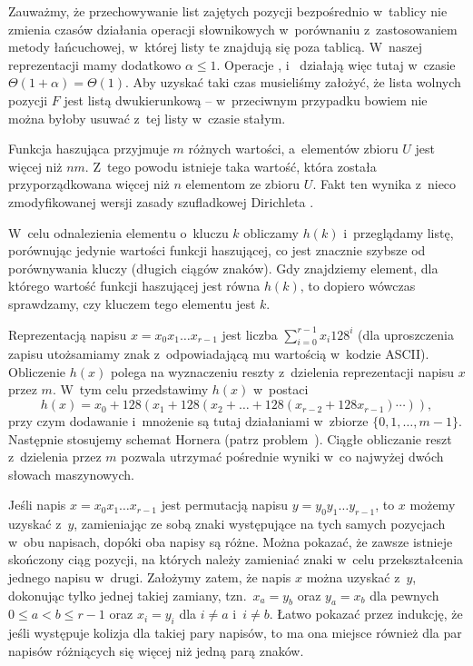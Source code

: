 Zauważmy, że przechowywanie list zajętych pozycji bezpośrednio w~tablicy nie zmienia czasów działania operacji słownikowych w~porównaniu z~zastosowaniem metody łańcuchowej, w~której listy te znajdują się poza tablicą. W~naszej reprezentacji mamy dodatkowo $\alpha\le1$. Operacje ,  i~ działają więc tutaj w~czasie $\Theta(1+\alpha)=\Theta(1)$. Aby uzyskać taki czas musieliśmy założyć, że lista wolnych pozycji $F$ jest listą dwukierunkową -- w~przeciwnym przypadku bowiem nie można byłoby usuwać z~tej listy w~czasie stałym.

\exercise %
Funkcja haszująca przyjmuje $m$ różnych wartości, a~elementów zbioru $U$ jest więcej niż $nm$. Z~tego powodu istnieje taka wartość, która została przyporządkowana więcej niż $n$ elementom ze zbioru $U$. Fakt ten wynika z~nieco zmodyfikowanej wersji zasady szufladkowej Dirichleta \cite{pigeonholeprinciple}.


\exercise %
W~celu odnalezienia elementu o~kluczu $k$ obliczamy $h(k)$ i~przeglądamy listę, porównując jedynie wartości funkcji haszującej, co jest znacznie szybsze od porównywania kluczy (długich ciągów znaków). Gdy znajdziemy element, dla którego wartość funkcji haszującej jest równa $h(k)$, to dopiero wówczas sprawdzamy, czy kluczem tego elementu jest $k$.

\exercise %
Reprezentacją napisu $x=x_0x_1\dots x_{r-1}$ jest liczba $\sum_{i=0}^{r-1}x_i128^i$ (dla uproszczenia zapisu utożsamiamy znak z~odpowiadającą mu wartością w~kodzie ASCII). Obliczenie $h(x)$ polega na wyznaczeniu reszty z~dzielenia reprezentacji napisu $x$ przez $m$. W~tym celu przedstawimy $h(x)$ w~postaci
\[
	h(x) = x_0+128(x_1+128(x_2+\dots+128(x_{r-2}+128x_{r-1})\cdots)),
\]
przy czym dodawanie i~mnożenie są tutaj działaniami w~zbiorze $\{0,1,\dots,m-1\}$. Następnie stosujemy schemat Hornera (patrz problem~). Ciągłe obliczanie reszt z~dzielenia przez $m$ pozwala utrzymać pośrednie wyniki w~co najwyżej dwóch słowach maszynowych.

\exercise %
Jeśli napis $x=x_0x_1\dots x_{r-1}$ jest permutacją napisu $y=y_0y_1\dots y_{r-1}$, to $x$ możemy uzyskać z~$y$, zamieniając ze sobą znaki występujące na tych samych pozycjach w~obu napisach, dopóki oba napisy są różne. Można pokazać, że zawsze istnieje skończony ciąg pozycji, na których należy zamieniać znaki w~celu przekształcenia jednego napisu w~drugi. Założymy zatem, że napis $x$ można uzyskać z~$y$, dokonując tylko jednej takiej zamiany, tzn.\ $x_a=y_b$ oraz $y_a=x_b$ dla pewnych $0\le a<b\le r-1$ oraz $x_i=y_i$ dla $i\ne a$ i~$i\ne b$. Łatwo pokazać przez indukcję, że jeśli występuje kolizja dla takiej pary napisów, to ma ona miejsce również dla par napisów różniących się więcej niż jedną parą znaków.

